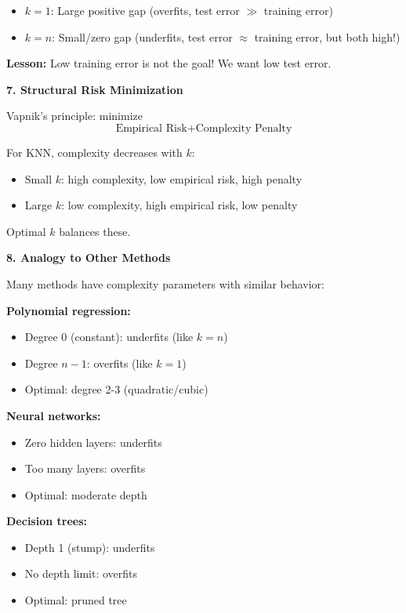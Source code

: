 \documentclass[12pt]{article}
\begin{document}
\begin{explanation}
\begin{itemize}
    \item \(k=1\): Large positive gap (overfits, test error \(\gg\) training error)
    \item \(k=n\): Small/zero gap (underfits, test error \(\approx\) training error, but both high!)
\end{itemize}

\textbf{Lesson:} Low training error is not the goal! We want low test error.

\textbf{7. Structural Risk Minimization}

Vapnik's principle: minimize
\[
\text{Empirical Risk} + \text{Complexity Penalty}
\]

For KNN, complexity decreases with \(k\):
\begin{itemize}
    \item Small \(k\): high complexity, low empirical risk, high penalty
    \item Large \(k\): low complexity, high empirical risk, low penalty
\end{itemize}

Optimal \(k\) balances these.

\textbf{8. Analogy to Other Methods}

Many methods have complexity parameters with similar behavior:

\textbf{Polynomial regression:}
\begin{itemize}
    \item Degree 0 (constant): underfits (like \(k=n\))
    \item Degree \(n-1\): overfits (like \(k=1\))
    \item Optimal: degree 2-3 (quadratic/cubic)
\end{itemize}

\textbf{Neural networks:}
\begin{itemize}
    \item Zero hidden layers: underfits
    \item Too many layers: overfits
    \item Optimal: moderate depth
\end{itemize}

\textbf{Decision trees:}
\begin{itemize}
    \item Depth 1 (stump): underfits
    \item No depth limit: overfits
    \item Optimal: pruned tree
\end{itemize}


\end{explanation}
\end{document}
